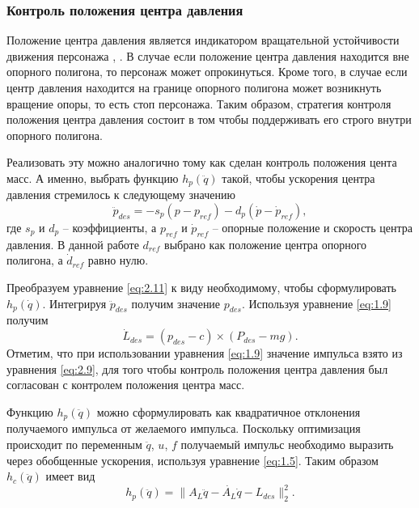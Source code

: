 \subsubsection{Контроль положения центра давления}

Положение центра давления является индикатором вращательной устойчивости движения персонажа \cite{MacchiettoZS}, \cite{GoswamiK}. В случае если положение центра давления находится вне опорного полигона, то персонаж может опрокинуться. Кроме того, в случае если центр давления находится на границе опорного полигона может возникнуть вращение опоры, то есть стоп персонажа. Таким образом, стратегия контроля положения центра давления состоит в том чтобы поддерживать его строго внутри опорного полигона.

Реализовать эту можно аналогично тому как сделан контроль положения цента масс. А именно, выбрать функцию $h_{p}(\ddot{q})$ такой, чтобы ускорения центра давления стремилось к следующему значению
\begin{equation*}
  \ddot{p}_{des} = - s_{p} (p - p_{ref}) - d_{p} (\dot{p} - \dot{p}_{ref}), \tag{2.11}\label{eq:2.11}
\end{equation*}
где $s_{p}$ и $d_{p}$ -- коэффициенты, а $p_{ref}$ и $\dot{p}_{ref}$ -- опорные положение и скорость центра давления. В данной работе $d_{ref}$ выбрано как положение центра опорного полигона, а $\dot{d}_{ref}$ равно нулю.

Преобразуем уравнение \ref{eq:2.11} к виду необходимому, чтобы сформулировать $h_p(\dot{q})$. Интегрируя $\ddot{p}_{des}$ получим значение $p_{des}$. Используя уравнение \ref{eq:1.9} получим
\begin{equation*}
  \dot{L}_{des} = (p_{des} - c) \times (P_{des} - mg). \tag{2.12}\label{eq:2.12}
\end{equation*}
Отметим, что при использовании уравнения \ref{eq:1.9} значение импульса взято из уравнения \ref{eq:2.9}, для того чтобы контроль положения центра давления был согласован с контролем положения центра масс.

Функцию $h_{p}(\ddot{q})$ можно сформулировать как квадратичное отклонения получаемого импульса от желаемого импульса. Поскольку оптимизация происходит по переменным $\ddot{q}$, $u$, $f$ получаемый импульс необходимо выразить через обобщенные ускорения, используя уравнение \ref{eq:1.5}. Таким образом $h_c(\ddot{q})$ имеет вид
\begin{equation*}
  h_{p}(\ddot{q}) = \lVert A_{L}\ddot{q} - \dot{A_{L}} \dot{q} - L_{des} \rVert_{2}^{2}. \tag{2.13}\label{eq:2.13}
\end{equation*}

